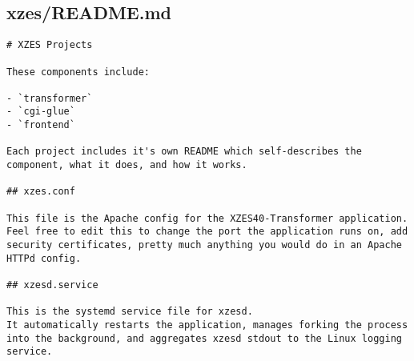 \subsection{xzes/README.md}
\begin{lstlisting}[caption={xzes code README}]
# XZES Projects

These components include:

- `transformer`
- `cgi-glue`
- `frontend`

Each project includes it's own README which self-describes the component, what it does, and how it works.

## xzes.conf

This file is the Apache config for the XZES40-Transformer application.
Feel free to edit this to change the port the application runs on, add security certificates, pretty much anything you would do in an Apache HTTPd config.

## xzesd.service

This is the systemd service file for xzesd.
It automatically restarts the application, manages forking the process into the background, and aggregates xzesd stdout to the Linux logging service.
\end{lstlisting}
